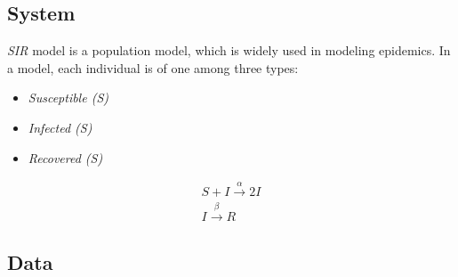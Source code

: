 \subsection{System}
\textit{SIR} model  is a population model, which is widely used in modeling epidemics. In a  model, each individual is of one among three types:
\begin{itemize}
    \item \textit{Susceptible (S)}
    \item \textit{Infected (S)}
    \item \textit{Recovered (S)}
\end{itemize}
\begin{align*}
    S + I \xrightarrow{\alpha} 2I \\
    I \xrightarrow{\beta} R
\end{align*}

\subsection{Data}
